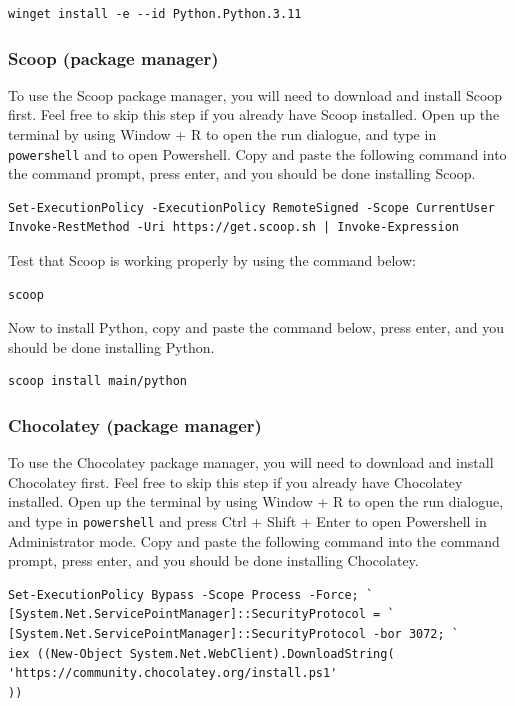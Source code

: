 \documentclass[11pt]{article}
\begin{document}
\begin{verbatim}
winget install -e --id Python.Python.3.11
\end{verbatim}

 \newpage

\subsubsection{Scoop (package manager)}
\label{sec:org81a64b0}
To use the Scoop package manager, you will need to download and install Scoop first. Feel free to skip this step if you already have Scoop installed. Open up the terminal by using Window + R to open the run dialogue, and type in \texttt{powershell} and to open Powershell. Copy and paste the following command into the command prompt, press enter, and you should be done installing Scoop.

\begin{verbatim}
Set-ExecutionPolicy -ExecutionPolicy RemoteSigned -Scope CurrentUser
Invoke-RestMethod -Uri https://get.scoop.sh | Invoke-Expression
\end{verbatim}

Test that Scoop is working properly by using the command below:
\begin{verbatim}
scoop
\end{verbatim}

Now to install Python, copy and paste the command below, press enter, and you should be done installing Python.
\begin{verbatim}
scoop install main/python
\end{verbatim}

\subsubsection{Chocolatey (package manager)}
\label{sec:org7e03166}
To use the Chocolatey package manager, you will need to download and install Chocolatey first. Feel free to skip this step if you already have Chocolatey installed. Open up the terminal by using Window + R to open the run dialogue, and type in \texttt{powershell} and press Ctrl + Shift + Enter to open Powershell in Administrator mode. Copy and paste the following command into the command prompt, press enter, and you should be done installing Chocolatey.

\begin{verbatim}
Set-ExecutionPolicy Bypass -Scope Process -Force; `
[System.Net.ServicePointManager]::SecurityProtocol = `
[System.Net.ServicePointManager]::SecurityProtocol -bor 3072; `
iex ((New-Object System.Net.WebClient).DownloadString(
'https://community.chocolatey.org/install.ps1'
))
\end{verbatim}
\end{document}
